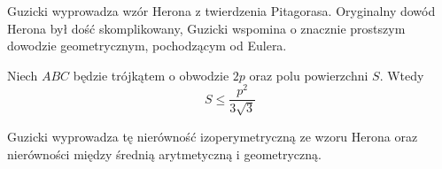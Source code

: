 %

Guzicki \cite[s. 165-168]{guzicki_2021} wyprowadza wzór Herona z twierdzenia Pitagorasa.
Oryginalny dowód Herona był dość skomplikowany, Guzicki \cite[s. 168-169]{guzicki_2021} wspomina o znacznie prostszym dowodzie geometrycznym, pochodzącym od Eulera.
%

\begin{proposition}
	Niech $ABC$ będzie trójkątem o obwodzie $2p$ oraz polu powierzchni $S$.
	Wtedy
	\begin{equation}
		S \le \frac{p^2}{3 \sqrt{3}}
	\end{equation}
\end{proposition}

Guzicki wyprowadza tę nierówność izoperymetryczną ze wzoru Herona oraz nierówności między średnią arytmetyczną i geometryczną.



%